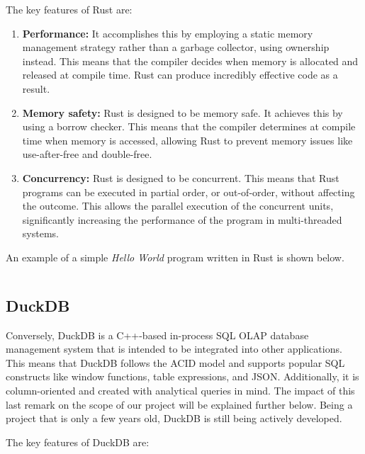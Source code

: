 The key features of Rust are:

\begin{enumerate}
    \itemsep0.5em
    \item \textbf{Performance:} It accomplishes this by employing a static memory management strategy rather than a garbage collector, using ownership instead. This means that the compiler decides when memory is allocated and released at compile time. Rust can produce incredibly effective code as a result.
    \item \textbf{Memory safety:} Rust is designed to be memory safe. It achieves this by using a borrow checker. This means that the compiler determines at compile time when memory is accessed, allowing Rust to prevent memory issues like use-after-free and double-free.
    \item \textbf{Concurrency:} Rust is designed to be concurrent. This means that Rust programs can be executed in partial order, or out-of-order, without affecting the outcome. This allows the parallel execution of the concurrent units, significantly increasing the performance of the program in multi-threaded systems.
\end{enumerate}

An example of a simple \textit{Hello World} program written in Rust is shown below.

\begin{code}
    \inputminted{rust}{code/listings/9-1_helloWorld.rs}
\end{code}

\subsection{DuckDB}

Conversely, DuckDB is a C++-based in-process SQL OLAP database management system that is intended to be integrated into other applications. This means that DuckDB follows the ACID model and supports popular SQL constructs like window functions, table expressions, and JSON. Additionally, it is column-oriented and created with analytical queries in mind. The impact of this last remark on the scope of our project will be explained further below. Being a project that is only a few years old, DuckDB is still being actively developed.

The key features of DuckDB are:

